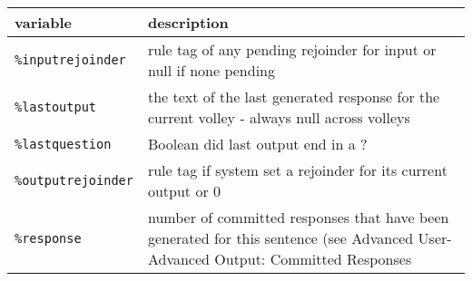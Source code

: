 \documentclass[]{article}
\begin{document}
\begin{longtable}[]{@{}ll@{}}
\toprule
\begin{minipage}[b]{0.12\columnwidth}\raggedright\strut
variable\strut
\end{minipage} & \begin{minipage}[b]{0.17\columnwidth}\raggedright\strut
description\strut
\end{minipage}\tabularnewline
\midrule
\endhead
\begin{minipage}[t]{0.12\columnwidth}\raggedright\strut
\texttt{\%inputrejoinder}\strut
\end{minipage} & \begin{minipage}[t]{0.17\columnwidth}\raggedright\strut
rule tag of any pending rejoinder for input or null if none
pending\strut
\end{minipage}\tabularnewline
\begin{minipage}[t]{0.12\columnwidth}\raggedright\strut
\texttt{\%lastoutput}\strut
\end{minipage} & \begin{minipage}[t]{0.17\columnwidth}\raggedright\strut
the text of the last generated response for the current volley - always
null across volleys\strut
\end{minipage}\tabularnewline
\begin{minipage}[t]{0.12\columnwidth}\raggedright\strut
\texttt{\%lastquestion}\strut
\end{minipage} & \begin{minipage}[t]{0.17\columnwidth}\raggedright\strut
Boolean did last output end in a ?\strut
\end{minipage}\tabularnewline
\begin{minipage}[t]{0.12\columnwidth}\raggedright\strut
\texttt{\%outputrejoinder}\strut
\end{minipage} & \begin{minipage}[t]{0.17\columnwidth}\raggedright\strut
rule tag if system set a rejoinder for its current output or 0\strut
\end{minipage}\tabularnewline
\begin{minipage}[t]{0.12\columnwidth}\raggedright\strut
\texttt{\%response}\strut
\end{minipage} & \begin{minipage}[t]{0.17\columnwidth}\raggedright\strut
number of committed responses that have been generated for this sentence
(see Advanced User- Advanced Output: Committed Responses\strut
\end{minipage}\tabularnewline
\bottomrule
\end{longtable}
\end{document}
